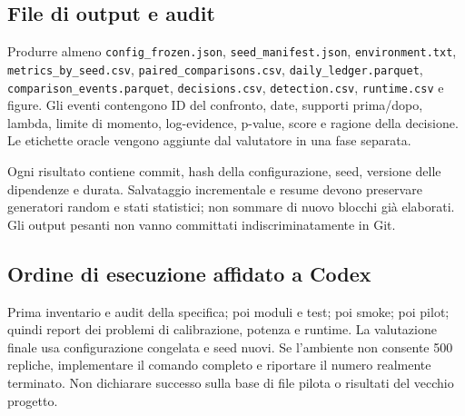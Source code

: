 \documentclass[11pt,a4paper]{article}
\theoremstyle{definition}\newtheorem{definition}[theorem]{Definizione}
\theoremstyle{remark}\newtheorem{remark}[theorem]{Osservazione}
\begin{document}
\subsection{File di output e audit}
Produrre almeno \nolinkurl{config_frozen.json}, \nolinkurl{seed_manifest.json}, \nolinkurl{environment.txt}, \nolinkurl{metrics_by_seed.csv}, \nolinkurl{paired_comparisons.csv}, \nolinkurl{daily_ledger.parquet}, \nolinkurl{comparison_events.parquet}, \nolinkurl{decisions.csv}, \nolinkurl{detection.csv}, \nolinkurl{runtime.csv} e figure. Gli eventi contengono ID del confronto, date, supporti prima/dopo, lambda, limite di momento, log-evidence, p-value, score e ragione della decisione. Le etichette oracle vengono aggiunte dal valutatore in una fase separata.

Ogni risultato contiene commit, hash della configurazione, seed, versione delle dipendenze e durata. Salvataggio incrementale e resume devono preservare generatori random e stati statistici; non sommare di nuovo blocchi già elaborati. Gli output pesanti non vanno committati indiscriminatamente in Git.

\subsection{Ordine di esecuzione affidato a Codex}
Prima inventario e audit della specifica; poi moduli e test; poi smoke; poi pilot; quindi report dei problemi di calibrazione, potenza e runtime. La valutazione finale usa configurazione congelata e seed nuovi. Se l'ambiente non consente 500 repliche, implementare il comando completo e riportare il numero realmente terminato. Non dichiarare successo sulla base di file pilota o risultati del vecchio progetto.
\end{document}
